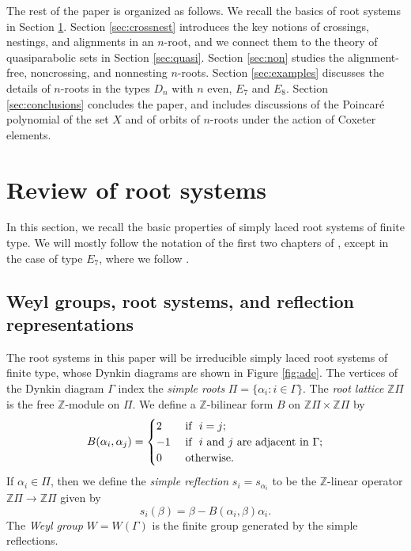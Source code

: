 \documentclass[11pt]{amsart}
\theoremstyle{plain}
\theoremstyle{definition}
\theoremstyle{remark}
\numberwithin{equation}{subsection}
\newcommand{\al}{\alpha}
\newcommand{\be}{\beta}
\newcommand{\Z}{{\mathbb Z}}
\newcommand{\simproots}{\Pi}
\begin{document}
The rest of the paper is organized as follows. We recall the basics of root
systems in Section \ref{sec:roots}.  Section \ref{sec:crossnest} introduces the
key notions of crossings, nestings, and alignments in an $n$-root, and we
connect them to the theory of quasiparabolic sets in Section \ref{sec:quasi}.
 Section \ref{sec:non}
studies the alignment-free, noncrossing, and nonnesting $n$-roots.  Section
\ref{sec:examples} discusses the details of $n$-roots in the types $D_n$ with
$n$ even, $E_7$ and $E_8$. Section \ref{sec:conclusions} concludes the paper,
and includes discussions of the Poincar\'e polynomial of the set $X$ and of
orbits of $n$-roots under the action of Coxeter elements.





\section{Review of root systems}\label{sec:roots}

In this section, we recall the basic properties of simply laced root
systems of finite type. We will mostly follow the notation of the first two
chapters of \cite{humphreys90}, except in the case of type $E_7$, where we
follow \cite[Section 4]{green08}.


\subsection{Weyl groups, root systems, and reflection representations} 
\label{sec:basics}
The root systems in this paper will be irreducible simply laced root systems of finite type,
whose Dynkin diagrams are shown in Figure \ref{fig:ade}.  The vertices of the
Dynkin diagram $\Gamma$ index the {\it simple roots} $\simproots = \{\alpha_i :
    i \in \Gamma\}$. The {\it root lattice} $\Z\simproots$ is the free
    $\Z$-module on $\simproots$. We define a $\Z$-bilinear form $B$ on
    $\Z\simproots \times \Z\simproots$ by $$ B(\alpha_i, \alpha_j) =
    \begin{cases} 2 & \text{\ if \ } i = j;\\ -1 & \text{\ if \ $i$\ and\ $j$\
        are\ adjacent\ in\ } \Gamma;\\ 0 & \text{\ otherwise.}\\
    \end{cases} $$ If $\al_i \in \simproots$, then we define the {\it simple
    reflection} $s_i=s_{\al_i}$ to be the $\Z$-linear operator $\Z\simproots
    \rightarrow \Z\simproots$ given by $$ s_i(\be) = \be - B(\al_i, \be)\al_i
    .$$ The {\it Weyl group} $W = W(\Gamma)$ is the finite group generated by
    the simple reflections. 
\end{document}
